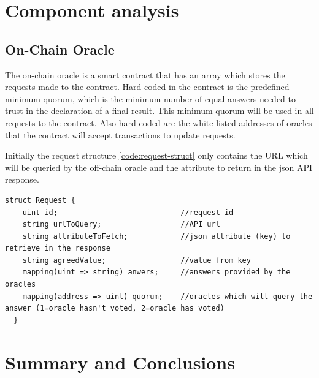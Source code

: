 \section{Component analysis}


\subsection{On-Chain Oracle}

The on-chain oracle is a smart contract that has an array which stores the requests made to the contract. Hard-coded in the contract is the predefined minimum quorum, which is the minimum number of equal answers needed to trust in the declaration of a final result. This minimum quorum will be used in all requests to the contract.
Also hard-coded are the white-listed addresses of oracles that the contract will accept transactions to update requests.

Initially the request structure \ref{code:request-struct} only contains the URL which will be queried by the off-chain oracle and the attribute to return in the json API response.

\begin{lstlisting}[language=Solidity, label=code:request-struct]
  struct Request {
    uint id;                            //request id
    string urlToQuery;                  //API url
    string attributeToFetch;            //json attribute (key) to retrieve in the response
    string agreedValue;                 //value from key
    mapping(uint => string) anwers;     //answers provided by the oracles
    mapping(address => uint) quorum;    //oracles which will query the answer (1=oracle hasn't voted, 2=oracle has voted)
  }
\end{lstlisting}


\section{Summary and Conclusions}
